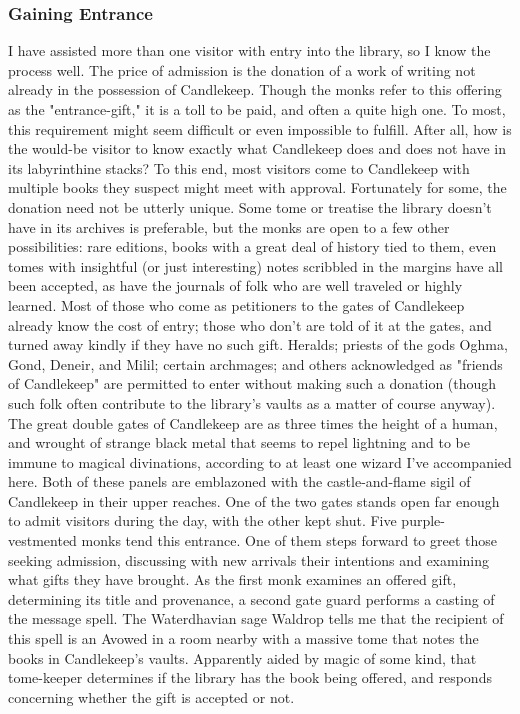 \documentclass[10pt,a4paper,twoside,twocolumn,openany,bg=print,nodeprecatedcode]{dndbook}
\begin{document}
\subsubsection{Gaining Entrance}
I have assisted more than one visitor with entry into the library, so I know the process well. The price of admission is the donation of a work of writing not already in the possession of Candlekeep. Though the monks refer to this offering as the "entrance-gift," it is a toll to be paid, and often a quite high one.
To most, this requirement might seem difficult or even impossible to fulfill. After all, how is the would-be visitor to know exactly what Candlekeep does and does not have in its labyrinthine stacks? To this end, most visitors come to Candlekeep with multiple books they suspect might meet with approval.
Fortunately for some, the donation need not be utterly unique. Some tome or treatise the library doesn't have in its archives is preferable, but the monks are open to a few other possibilities: rare editions, books with a great deal of history tied to them, even tomes with insightful (or just interesting) notes scribbled in the margins have all been accepted, as have the journals of folk who are well traveled or highly learned.
Most of those who come as petitioners to the gates of Candlekeep already know the cost of entry; those who don't are told of it at the gates, and turned away kindly if they have no such gift. Heralds; priests of the gods Oghma, Gond, Deneir, and Milil; certain archmages; and others acknowledged as "friends of Candlekeep" are permitted to enter without making such a donation (though such folk often contribute to the library's vaults as a matter of course anyway).
The great double gates of Candlekeep are as three times the height of a human, and wrought of strange black metal that seems to repel lightning and to be immune to magical divinations, according to at least one wizard I've accompanied here. Both of these panels are emblazoned with the castle-and-flame sigil of Candlekeep in their upper reaches. One of the two gates stands open far enough to admit visitors during the day, with the other kept shut.
Five purple-vestmented monks tend this entrance. One of them steps forward to greet those seeking admission, discussing with new arrivals their intentions and examining what gifts they have brought. As the first monk examines an offered gift, determining its title and provenance, a second gate guard performs a casting of the message spell. The Waterdhavian sage Waldrop tells me that the recipient of this spell is an Avowed in a room nearby with a massive tome that notes the books in Candlekeep's vaults. Apparently aided by magic of some kind, that tome-keeper determines if the library has the book being offered, and responds concerning whether the gift is accepted or not.
\end{document}
